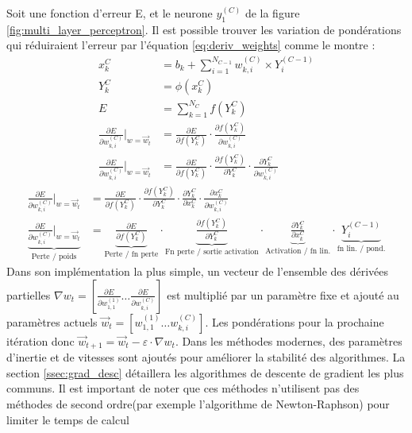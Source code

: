       Soit une fonction d'erreur E, et le neurone $ y^{(C)}_1 $ de la figure \ref{fig:multi_layer_perceptron}. Il est possible trouver les variation de pondérations qui réduiraient l'erreur par l'équation \ref{eq:deriv_weights} comme le montre \textcite{Rumelhart:LearningRepresentations:1986}:
      \begin{align}
        x^{C}_k &= b_k + \sum_{i=1}^{N_{C-1}} w^{(C)}_{k,i} \times Y^{(C-1)}_i\\
        Y^{C}_k &= \phi(x^{C}_k)\\
        E &= \sum^{N_C}_{k=1} f(Y^{C}_k)\\
        \frac{\partial{E}}{\partial{w^{(C)}_{k,i}}}\bigg|_{w=\overrightarrow{w}_{t}} &= \frac{\partial{E}}{\partial{f(Y^{C}_k)}} \cdot \frac{\partial{f(Y^{C}_k)}}{\partial{w^{(C)}_{k,i}}}\\
        \frac{\partial{E}}{\partial{w^{(C)}_{k,i}}}\bigg|_{w=\overrightarrow{w}_{t}} &= \frac{\partial{E}}{\partial{f(Y^{C}_k)}} \cdot \frac{\partial{f(Y^{C}_k)}}{\partial{Y^{C}_k}} \cdot \frac{\partial{Y^{C}_k}}{\partial{w^{(C)}_{k,i}}} 
    \end{align}
    \begin{align}
        \frac{\partial{E}}{\partial{w^{(C)}_{k,i}}}\bigg|_{w=\overrightarrow{w}_{t}} &= \frac{\partial{E}}{\partial{f(Y^{C}_k)}} \cdot \frac{\partial{f(Y^{C}_k)}}{\partial{Y^{C}_k}} \cdot \frac{\partial{Y^{C}_k}}{\partial{x^{C}_k}} \cdot \frac{\partial{x^{C}_k}}{\partial{w^{(C)}_{k,i}}}\\
        \underbrace{\frac{\partial{E}}{\partial{w^{(C)}_{k,i}}}\bigg|_{w=\overrightarrow{w}_{t}}}_\text{Perte / poids} &= \underbrace{\frac{\partial{E}}{\partial{f(Y^{C}_k)}}}_\text{Perte / fn perte} \cdot \underbrace{\frac{\partial{f(Y^{C}_k)}}{\partial{Y^{C}_k}}}_\text{Fn perte / sortie activation} \cdot \underbrace{\frac{\partial{Y^{C}_k}}{\partial{x^{C}_k}}}_\text{Activation / fn lin.} \cdot \underbrace{Y^{(C-1)}_i}_\text{fn lin. / pond.}\label{eq:deriv_weights}
      \end{align}
    Dans son implémentation la plus simple, un vecteur de l'ensemble des dérivées partielles $\nabla{w_{t}} = \left[ \frac{\partial{E}}{\partial{w^{(1)}_{1,1}}} \ldots \frac{\partial{E}}{\partial{w^{(C)}_{k,i}}} \right] $ est multiplié par un paramètre fixe et ajouté au paramètres actuels $\overrightarrow{w}_{t} = \left[w^{(1)}_{1,1} \ldots w^{(C)}_{k,i}  \right] $. Les pondérations pour la prochaine itération donc $\overrightarrow{w}_{t+1} = \overrightarrow{w}_{t} - \varepsilon \cdot \nabla{w_{t}} $. Dans les méthodes modernes, des paramètres d'inertie et de vitesses sont ajoutés pour améliorer la stabilité des algorithmes. La section \ref{ssec:grad_desc} détaillera les algorithmes de descente de gradient les plus communs. Il est important de noter que ces méthodes n'utilisent pas des méthodes de second ordre(par exemple l'algorithme de Newton-Raphson) pour limiter le temps de calcul 
